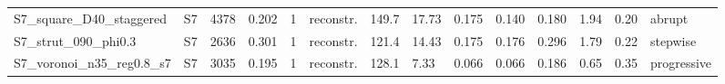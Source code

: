 \begin{landscape}
\begin{longtable}{llllllllllllll}
S7\_square\_D40\_staggered & S7 & 4378 & 0.202 & 1 & reconstr. & 149.7 & 17.73 & 0.175 & 0.140 & 0.180 & 1.94 & 0.20 & abrupt\\
S7\_strut\_090\_phi0.3 & S7 & 2636 & 0.301 & 1 & reconstr. & 121.4 & 14.43 & 0.175 & 0.176 & 0.296 & 1.79 & 0.22 & stepwise\\
S7\_voronoi\_n35\_reg0.8\_s7 & S7 & 3035 & 0.195 & 1 & reconstr. & 128.1 & 7.33 & 0.066 & 0.066 & 0.186 & 0.65 & 0.35 & progressive\\
\bottomrule\end{longtable}\end{landscape}